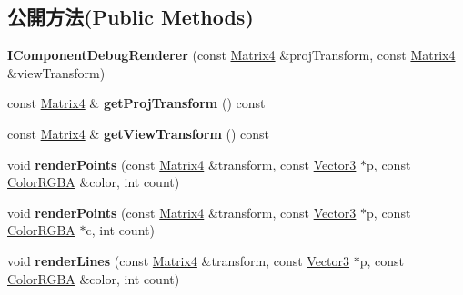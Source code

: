 \subsection*{公開方法(Public Methods)}
\begin{DoxyCompactItemize}
\item 
{\bfseries I\+Component\+Debug\+Renderer} (const \hyperlink{class_i_dream_sky_1_1_matrix4}{Matrix4} \&proj\+Transform, const \hyperlink{class_i_dream_sky_1_1_matrix4}{Matrix4} \&view\+Transform)\hypertarget{class_i_dream_sky_1_1_i_component_debug_renderer_acb3e2846ae5304a686d3e2e4fa332f2d}{}\label{class_i_dream_sky_1_1_i_component_debug_renderer_acb3e2846ae5304a686d3e2e4fa332f2d}

\item 
const \hyperlink{class_i_dream_sky_1_1_matrix4}{Matrix4} \& {\bfseries get\+Proj\+Transform} () const \hypertarget{class_i_dream_sky_1_1_i_component_debug_renderer_a93394cd289d57080096a451e135a0810}{}\label{class_i_dream_sky_1_1_i_component_debug_renderer_a93394cd289d57080096a451e135a0810}

\item 
const \hyperlink{class_i_dream_sky_1_1_matrix4}{Matrix4} \& {\bfseries get\+View\+Transform} () const \hypertarget{class_i_dream_sky_1_1_i_component_debug_renderer_ada752f2ec1052bb063b50d2191e9371d}{}\label{class_i_dream_sky_1_1_i_component_debug_renderer_ada752f2ec1052bb063b50d2191e9371d}

\item 
void {\bfseries render\+Points} (const \hyperlink{class_i_dream_sky_1_1_matrix4}{Matrix4} \&transform, const \hyperlink{class_i_dream_sky_1_1_vector3}{Vector3} $\ast$p, const \hyperlink{class_i_dream_sky_1_1_color_r_g_b_a}{Color\+R\+G\+BA} \&color, int count)\hypertarget{class_i_dream_sky_1_1_i_component_debug_renderer_ace53456e12a1f08d3964f973303ad4ff}{}\label{class_i_dream_sky_1_1_i_component_debug_renderer_ace53456e12a1f08d3964f973303ad4ff}

\item 
void {\bfseries render\+Points} (const \hyperlink{class_i_dream_sky_1_1_matrix4}{Matrix4} \&transform, const \hyperlink{class_i_dream_sky_1_1_vector3}{Vector3} $\ast$p, const \hyperlink{class_i_dream_sky_1_1_color_r_g_b_a}{Color\+R\+G\+BA} $\ast$c, int count)\hypertarget{class_i_dream_sky_1_1_i_component_debug_renderer_a18651ad025eddfe5f6e9bc21fe81940a}{}\label{class_i_dream_sky_1_1_i_component_debug_renderer_a18651ad025eddfe5f6e9bc21fe81940a}

\item 
void {\bfseries render\+Lines} (const \hyperlink{class_i_dream_sky_1_1_matrix4}{Matrix4} \&transform, const \hyperlink{class_i_dream_sky_1_1_vector3}{Vector3} $\ast$p, const \hyperlink{class_i_dream_sky_1_1_color_r_g_b_a}{Color\+R\+G\+BA} \&color, int count)\hypertarget{class_i_dream_sky_1_1_i_component_debug_renderer_a8c4f61e448ae48b963cb6cba6502f33f}{}\label{class_i_dream_sky_1_1_i_component_debug_renderer_a8c4f61e448ae48b963cb6cba6502f33f}


\end{DoxyCompactItemize}
